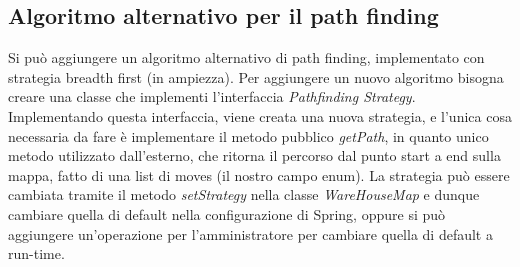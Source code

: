 \subsection{Algoritmo alternativo per il path finding}
Si può aggiungere un algoritmo alternativo di path finding, implementato con strategia breadth first (in ampiezza).
Per aggiungere un nuovo algoritmo bisogna creare una classe che implementi l'interfaccia \textit{Pathfinding Strategy}. Implementando questa interfaccia, viene creata una nuova strategia, e l'unica cosa necessaria da fare è implementare il metodo pubblico \textit{getPath}, in quanto unico metodo utilizzato dall'esterno, che ritorna il percorso dal punto start a end sulla mappa, fatto di una list di moves (il nostro campo enum).
La strategia può essere cambiata tramite il metodo \textit{setStrategy} nella classe \textit{WareHouseMap} e dunque cambiare quella di default nella configurazione di Spring, oppure si può aggiungere un'operazione per l'amministratore per cambiare quella di default a run-time.

